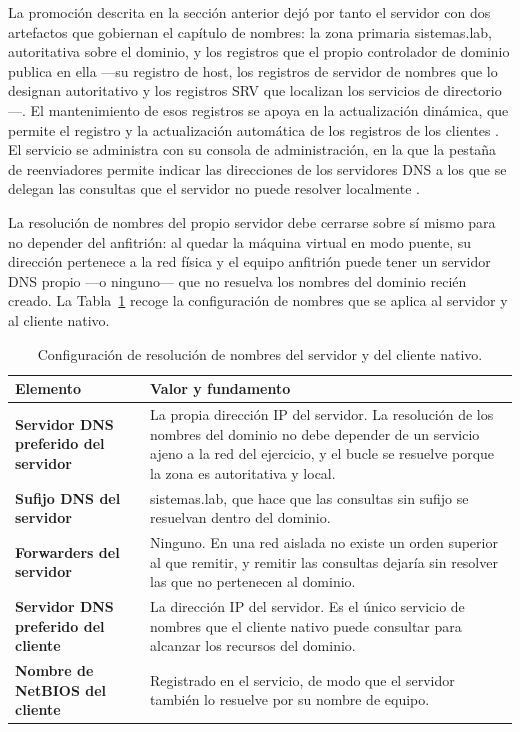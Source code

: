 \documentclass[12pt]{article}
\begin{document}
La promoción descrita en la sección anterior dejó por tanto el servidor con dos artefactos que gobiernan el capítulo de nombres: la zona primaria sistemas.lab, autoritativa sobre el dominio, y los registros que el propio controlador de dominio publica en ella ---su registro de host, los registros de servidor de nombres que lo designan autoritativo y los registros SRV que localizan los servicios de directorio---. El mantenimiento de esos registros se apoya en la actualización dinámica, que permite el registro y la actualización automática de los registros de los clientes \parencite{microsoftDnsOverview}. El servicio se administra con su consola de administración, en la que la pestaña de reenviadores permite indicar las direcciones de los servidores DNS a los que se delegan las consultas que el servidor no puede resolver localmente \parencite{microsoftDnsQuickstart}.

La resolución de nombres del propio servidor debe cerrarse sobre sí mismo para no depender del anfitrión: al quedar la máquina virtual en modo puente, su dirección pertenece a la red física y el equipo anfitrión puede tener un servidor DNS propio ---o ninguno--- que no resuelva los nombres del dominio recién creado. La Tabla~\ref{tab:configuracionDns} recoge la configuración de nombres que se aplica al servidor y al cliente nativo.

\begin{table}[H]
\centering
\small
\renewcommand{\arraystretch}{1.15}
\renewcommand{\tabularxcolumn}[1]{m{#1}}
\setlength{\emergencystretch}{1.5em}
\caption{Configuración de resolución de nombres del servidor y del cliente nativo.}
\label{tab:configuracionDns}
\begin{tabularx}{\textwidth}{>{\centering\arraybackslash}m{4.2cm} X}
\toprule
\textbf{Elemento} & \textbf{Valor y fundamento} \\
\midrule
\textbf{Servidor DNS preferido del servidor} & La propia dirección IP del servidor. La resolución de los nombres del dominio no debe depender de un servicio ajeno a la red del ejercicio, y el bucle se resuelve porque la zona es autoritativa y local. \\
\addlinespace
\textbf{Sufijo DNS del servidor} & sistemas.lab, que hace que las consultas sin sufijo se resuelvan dentro del dominio. \\
\addlinespace
\textbf{Forwarders del servidor} & Ninguno. En una red aislada no existe un orden superior al que remitir, y remitir las consultas dejaría sin resolver las que no pertenecen al dominio. \\
\addlinespace
\textbf{Servidor DNS preferido del cliente} & La dirección IP del servidor. Es el único servicio de nombres que el cliente nativo puede consultar para alcanzar los recursos del dominio. \\
\addlinespace
\textbf{Nombre de NetBIOS del cliente} & Registrado en el servicio, de modo que el servidor también lo resuelve por su nombre de equipo. \\
\bottomrule
\end{tabularx}
\end{table}
\end{document}
